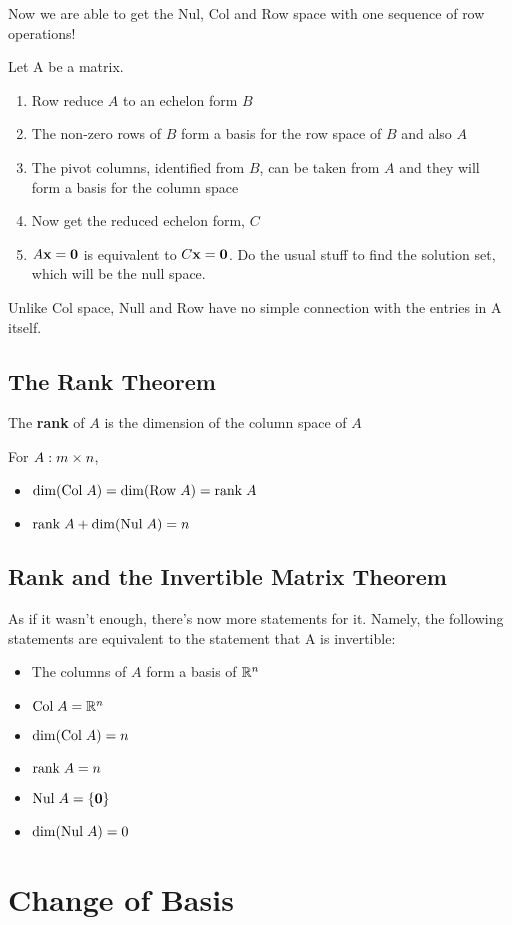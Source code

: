 \documentclass{report}
\begin{document}
Now we are able to get the Nul, Col and Row space with one sequence of row operations!
\begin{tcolorbox}[colback=blue!5!white, colframe=blue!75!black, title=Getting the trio]
Let A be a matrix.
\begin{enumerate}
    \item Row reduce $A$ to an echelon form $B$
    \item The non-zero rows of $B$ form a basis for the row space of $B$ and also $A$
    \item The pivot columns, identified from $B$, can be taken from $A$ and they will 
    form a basis for the column space
    \item Now get the reduced echelon form, $C$
    \item $A\mathbf{x} = \mathbf{0}$ is equivalent to $C\mathbf{x} = \mathbf{0}$. Do the usual stuff to find the 
    solution set, which will be the null space.
\end{enumerate}
Unlike Col space, Null and Row have no simple connection with the entries in A itself.
\end{tcolorbox}

\subsection{The Rank Theorem}
\begin{definition}
    The \textbf{rank} of $A$ is the dimension of the column space of $A$
\end{definition}

\begin{theorem}
    For $A: m \times n$, 
    \begin{itemize}
        \item $\dim (\mathrm{Col}\; A) = \dim (\mathrm{Row}\; A) = \mathrm{rank}\; A$
        \item $\mathrm{rank}\; A + \dim (\mathrm{Nul}\; A) = n$
    \end{itemize}
\end{theorem}

\subsection{Rank and the Invertible Matrix Theorem}
As if it wasn't enough, there's now more statements for it.
Namely, the following statements are equivalent to the statement that A is invertible:
\begin{itemize}
    \item The columns of $A$ form a basis of $\mathbb{R}^n$
    \item $\mathrm{Col}\; A = \mathbb{R}^n$
    \item $\dim (\mathrm{Col}\; A) = n$
    \item $\mathrm{rank}\; A = n$
    \item $\mathrm{Nul}\; A = \{\mathbf{0}\}$
    \item $\dim (\mathrm{Nul}\; A) = 0$
\end{itemize}

\section{Change of Basis}

\end{document}
